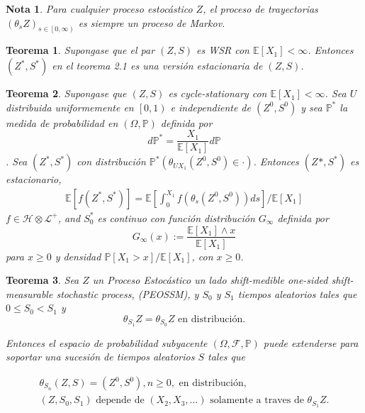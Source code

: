 \documentclass{article}
\newtheorem{Teo}{Teorema}
\newtheorem{Note}{Nota}
\newcommand{\esp}{\mathbb{E}}
\newcommand{\prob}{\mathbb{P}}
\begin{document}
\begin{Note}
Para cualquier proceso estoc\'astico $Z$, el proceso de trayectorias $\left(\theta_{s}Z\right)_{s\in\left[0,\infty\right)}$ es siempre un proceso de Markov.
\end{Note}



\begin{Teo}
Supongase que el par $\left(Z,S\right)$ es WSR con $\esp\left[X_{1}\right]<\infty$. Entonces $\left(Z^{*},S^{*}\right)$ en el teorema 2.1 es una versi\'on estacionaria de 
$\left(Z,S\right)$.
\end{Teo}


\begin{Teo}
Supongase que $\left(Z,S\right)$ es cycle-stationary con $\esp\left[X_{1}\right]<\infty$. Sea $U$ distribuida uniformemente en $\left[0,1\right)$ e independiente de $\left(Z^{0},S^{0}\right)$ y sea $\prob^{*}$ la medida de probabilidad en $\left(\Omega,\prob\right)$ definida por $$d\prob^{*}=\frac{X_{1}}{\esp\left[X_{1}\right]}d\prob$$. Sea $\left(Z^{*},S^{*}\right)$ con distribuci\'on $\prob^{*}\left(\theta_{UX_{1}}\left(Z^{0},S^{0}\right)\in\cdot\right)$. Entonces $\left(Z^{}*,S^{*}\right)$ es estacionario,
\begin{eqnarray*}
\esp\left[f\left(Z^{*},S^{*}\right)\right]=\esp\left[\int_{0}^{X_{1}}f\left(\theta_{s}\left(Z^{0},S^{0}\right)\right)ds\right]/\esp\left[X_{1}\right]
\end{eqnarray*}
$f\in\mathcal{H}\otimes\mathcal{L}^{+}$, and $S_{0}^{*}$ es continuo con funci\'on distribuci\'on $G_{\infty}$ definida por $$G_{\infty}\left(x\right):=\frac{\esp\left[X_{1}\right]\wedge x}{\esp\left[X_{1}\right]}$$ para $x\geq0$ y densidad $\prob\left[X_{1}>x\right]/\esp\left[X_{1}\right]$, con $x\geq0$.

\end{Teo}


\begin{Teo}
Sea $Z$ un Proceso Estoc\'astico un lado shift-medible \textit{one-sided shift-measurable stochastic process}, (PEOSSM),
y $S_{0}$ y $S_{1}$ tiempos aleatorios tales que $0\leq S_{0}<S_{1}$ y
\begin{equation}
\theta_{S_{1}}Z=\theta_{S_{0}}Z\textrm{ en distribuci\'on}.
\end{equation}

Entonces el espacio de probabilidad subyacente $\left(\Omega,\mathcal{F},\prob\right)$ puede extenderse para soportar una sucesi\'on de tiempos aleatorios $S$ tales que

\begin{eqnarray}
\theta_{S_{n}}\left(Z,S\right)=\left(Z^{0},S^{0}\right),n\geq0,\textrm{ en distribuci\'on},\\
\left(Z,S_{0},S_{1}\right)\textrm{ depende de }\left(X_{2},X_{3},\ldots\right)\textrm{ solamente a traves de }\theta_{S_{1}}Z.
\end{eqnarray}
\end{Teo}
\end{document}
